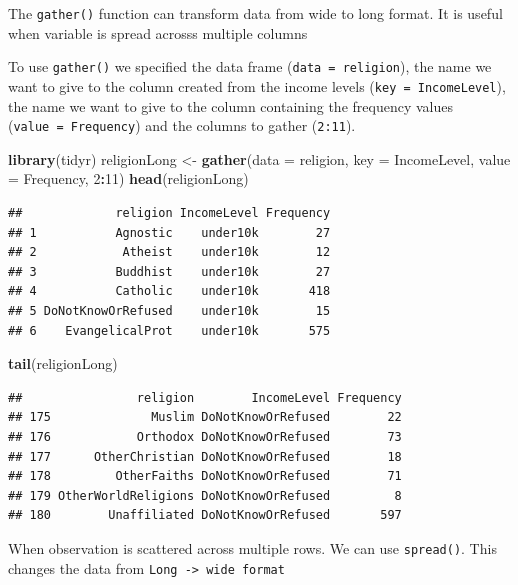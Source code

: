 \documentclass[]{article}
\newenvironment{Shaded}{\begin{snugshade}}{\end{snugshade}}
\newcommand{\KeywordTok}[1]{\textcolor[rgb]{0.13,0.29,0.53}{\textbf{#1}}}
\newcommand{\DataTypeTok}[1]{\textcolor[rgb]{0.13,0.29,0.53}{#1}}
\newcommand{\DecValTok}[1]{\textcolor[rgb]{0.00,0.00,0.81}{#1}}
\newcommand{\StringTok}[1]{\textcolor[rgb]{0.31,0.60,0.02}{#1}}
\newcommand{\OperatorTok}[1]{\textcolor[rgb]{0.81,0.36,0.00}{\textbf{#1}}}
\newcommand{\NormalTok}[1]{#1}
\begin{document}
The \texttt{gather()} function can transform data from wide to long
format. It is useful when variable is spread acrosss multiple columns

To use \texttt{gather()} we specified the data frame
(\texttt{data\ =\ religion}), the name we want to give to the column
created from the income levels (\texttt{key\ =\ IncomeLevel}), the name
we want to give to the column containing the frequency values
(\texttt{value\ =\ Frequency}) and the columns to gather
(\texttt{2:11}).

\begin{Shaded}
\begin{Highlighting}[]
\KeywordTok{library}\NormalTok{(tidyr)}
\NormalTok{religionLong <-}\StringTok{ }\KeywordTok{gather}\NormalTok{(}\DataTypeTok{data =}\NormalTok{ religion, }\DataTypeTok{key =}\NormalTok{ IncomeLevel, }\DataTypeTok{value =}\NormalTok{ Frequency, }\DecValTok{2}\OperatorTok{:}\DecValTok{11}\NormalTok{)}
\KeywordTok{head}\NormalTok{(religionLong)}
\end{Highlighting}
\end{Shaded}

\begin{verbatim}
##             religion IncomeLevel Frequency
## 1           Agnostic    under10k        27
## 2            Atheist    under10k        12
## 3           Buddhist    under10k        27
## 4           Catholic    under10k       418
## 5 DoNotKnowOrRefused    under10k        15
## 6    EvangelicalProt    under10k       575
\end{verbatim}

\begin{Shaded}
\begin{Highlighting}[]
\KeywordTok{tail}\NormalTok{(religionLong)}
\end{Highlighting}
\end{Shaded}

\begin{verbatim}
##                religion        IncomeLevel Frequency
## 175              Muslim DoNotKnowOrRefused        22
## 176            Orthodox DoNotKnowOrRefused        73
## 177      OtherChristian DoNotKnowOrRefused        18
## 178         OtherFaiths DoNotKnowOrRefused        71
## 179 OtherWorldReligions DoNotKnowOrRefused         8
## 180        Unaffiliated DoNotKnowOrRefused       597
\end{verbatim}

When observation is scattered across multiple rows. We can use
\texttt{spread()}. This changes the data from
\texttt{Long\ -\textgreater{}\ wide\ format}
\end{document}
